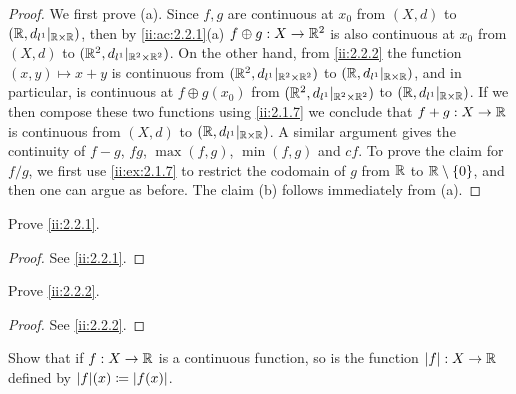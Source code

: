 \begin{proof}
  We first prove (a). Since \(f, g\) are continuous at \(x_0\) from \((X, d)\) to \((\mathbb{R}, d_{l^1}|_{\mathbb{R} \times \mathbb{R}})\), then by \cref{ii:ac:2.2.1}(a) \(f \oplus g : X \to \mathbb{R}^2\) is also continuous at \(x_0\) from \((X, d)\) to \((\mathbb{R}^2, d_{l^1}|_{\mathbb{R}^2 \times \mathbb{R}^2})\).
  On the other hand, from \cref{ii:2.2.2} the function \((x, y) \mapsto x + y\) is continuous from \((\mathbb{R}^2, d_{l^1}|_{\mathbb{R}^2 \times \mathbb{R}^2})\) to \((\mathbb{R}, d_{l^1}|_{\mathbb{R} \times \mathbb{R}})\), and in particular, is continuous at \(f \oplus g(x_0)\) from \((\mathbb{R}^2, d_{l^1}|_{\mathbb{R}^2 \times \mathbb{R}^2})\) to \((\mathbb{R}, d_{l^1}|_{\mathbb{R} \times \mathbb{R}})\).
  If we then compose these two functions using \cref{ii:2.1.7} we conclude that \(f + g : X \to \mathbb{R}\) is continuous from \((X, d)\) to \((\mathbb{R}, d_{l^1}|_{\mathbb{R} \times \mathbb{R}})\).
  A similar argument gives the continuity of \(f - g\), \(fg\), \(\max(f, g)\), \(\min(f, g)\) and \(cf\).
  To prove the claim for \(f / g\), we first use \cref{ii:ex:2.1.7} to restrict the codomain of \(g\) from \(\mathbb{R}\) to \(\mathbb{R} \setminus \left\lbrace0\right\rbrace\), and then one can argue as before.
  The claim (b) follows immediately from (a).
\end{proof}

\exercisesection

\begin{ex}\label{ii:ex:2.2.1}
  Prove \cref{ii:2.2.1}.
\end{ex}

\begin{proof}
  See \cref{ii:2.2.1}.
\end{proof}

\begin{ex}\label{ii:ex:2.2.2}
  Prove \cref{ii:2.2.2}.
\end{ex}

\begin{proof}
  See \cref{ii:2.2.2}.
\end{proof}

\begin{ex}\label{ii:ex:2.2.3}
  Show that if \(f : X \to \mathbb{R}\) is a continuous function, so is the function \(\left\lvert f\right\rvert : X \to \mathbb{R}\) defined by \(\abs{f}(x) \coloneqq \abs{f(x)}\).
\end{ex}


